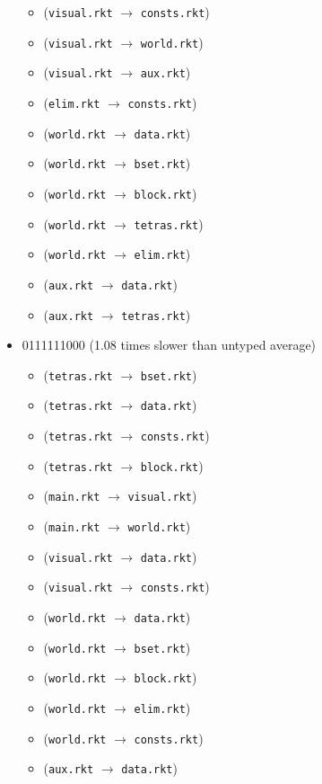 \documentclass{article}
\newcommand{\mono}[1]{\texttt{#1}}
\begin{document}
\begin{itemize}
\begin{itemize}
  \item (\mono{visual.rkt} $\rightarrow$ \mono{consts.rkt})
  \item (\mono{visual.rkt} $\rightarrow$ \mono{world.rkt})
  \item (\mono{visual.rkt} $\rightarrow$ \mono{aux.rkt})
  \item (\mono{elim.rkt} $\rightarrow$ \mono{consts.rkt})
  \item (\mono{world.rkt} $\rightarrow$ \mono{data.rkt})
  \item (\mono{world.rkt} $\rightarrow$ \mono{bset.rkt})
  \item (\mono{world.rkt} $\rightarrow$ \mono{block.rkt})
  \item (\mono{world.rkt} $\rightarrow$ \mono{tetras.rkt})
  \item (\mono{world.rkt} $\rightarrow$ \mono{elim.rkt})
  \item (\mono{aux.rkt} $\rightarrow$ \mono{data.rkt})
  \item (\mono{aux.rkt} $\rightarrow$ \mono{tetras.rkt})
  \end{itemize}
\item 0111111000 (1.08 times slower than untyped average)
  \begin{itemize}
  \item (\mono{tetras.rkt} $\rightarrow$ \mono{bset.rkt})
  \item (\mono{tetras.rkt} $\rightarrow$ \mono{data.rkt})
  \item (\mono{tetras.rkt} $\rightarrow$ \mono{consts.rkt})
  \item (\mono{tetras.rkt} $\rightarrow$ \mono{block.rkt})
  \item (\mono{main.rkt} $\rightarrow$ \mono{visual.rkt})
  \item (\mono{main.rkt} $\rightarrow$ \mono{world.rkt})
  \item (\mono{visual.rkt} $\rightarrow$ \mono{data.rkt})
  \item (\mono{visual.rkt} $\rightarrow$ \mono{consts.rkt})
  \item (\mono{world.rkt} $\rightarrow$ \mono{data.rkt})
  \item (\mono{world.rkt} $\rightarrow$ \mono{bset.rkt})
  \item (\mono{world.rkt} $\rightarrow$ \mono{block.rkt})
  \item (\mono{world.rkt} $\rightarrow$ \mono{elim.rkt})
  \item (\mono{world.rkt} $\rightarrow$ \mono{consts.rkt})
  \item (\mono{aux.rkt} $\rightarrow$ \mono{data.rkt})
  \end{itemize}


\end{itemize}
\end{document}
